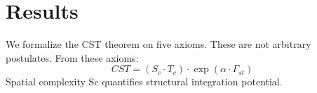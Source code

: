 \documentclass[a4paper,12pt]{article}
\begin{document}
\section{Results}

We formalize the CST theorem on five axioms. These are not arbitrary postulates.
From these axioms:
\begin{equation}
CST = (S_c \cdot T_c) \cdot \exp(\alpha \cdot \Gamma_{st}) \tag{1}
\end{equation}
Spatial complexity Sc quantifies structural integration potential.
\end{document}
